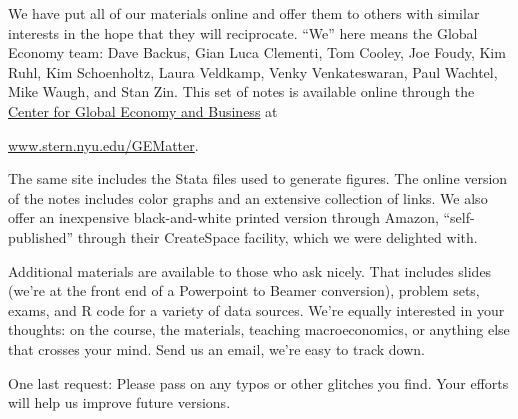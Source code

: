 We have put all of our materials online
and offer them to others with similar interests in the hope
that they will reciprocate.
``We'' here means the Global Economy team:
Dave Backus, Gian Luca Clementi, Tom Cooley, Joe Foudy, Kim Ruhl, Kim Schoenholtz,
Laura Veldkamp, Venky Venkateswaran, Paul Wachtel, Mike Waugh, and Stan Zin.
This set of notes is available online
through the
\href{http://www.stern.nyu.edu/experience-stern/about/departments-centers-initiatives/centers-of-research/global-economy-business/index.htm}
{Center for Global Economy and Business}
at

\vspace*{\parskip}
\centerline{\url{www.stern.nyu.edu/GEMatter}.}

The same site includes the Stata files used to generate figures.
The online version of the notes includes color graphs
and an extensive collection of links.
We also offer an inexpensive black-and-white printed version through Amazon,
``self-published'' through their CreateSpace facility,
which we were delighted with.

Additional materials are available to those who ask nicely.
That includes slides (we're at the front end of a Powerpoint to Beamer conversion),
problem sets, exams, and R code for a variety of data sources.
We're equally interested in your thoughts:  on the course,
the materials, teaching macroeconomics, or anything else that crosses
your mind.
Send us an email, we're easy to track down.

One last request:  Please pass on any typos or other glitches you find.
Your efforts will help us improve future versions.

